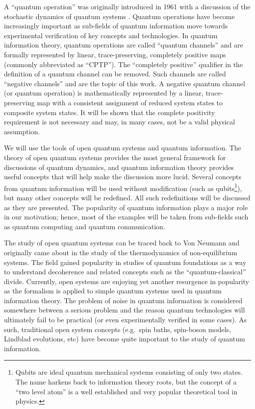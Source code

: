 A ``quantum operation'' was originally introduced in 1961 with a discussion of the stochastic dynamics of quantum systems \cite{Sudarshan1961}.  Quantum operations have become increasingly important as sub-fields of quantum information move towards experimental verification of key concepts and technologies.  In quantum information theory, quantum operations are called ``quantum channels'' and are formally represented by linear, trace-preserving, completely positive maps (commonly abbreviated as ``CPTP'').  The ``completely positive'' qualifier in the definition of a quantum channel can be removed.  Such channels are called ``negative channels'' and are the topic of this work.  A negative quantum channel (or quantum operation) is mathematically represented by a linear, trace-preserving map with a consistent assignment of reduced system states to composite system states.  It will be shown that the complete positivity requirement is not necessary and may, in many cases, not be a valid physical assumption.  

We will use the tools of open quantum systems and quantum information.  The theory of open quantum systems provides the most general framework for discussions of quantum dynamics, and quantum information theory provides useful concepts that will help make the discussion more lucid.  Several concepts from quantum information will be used without modification (such as qubits\footnote{Qubits are ideal quantum mechanical systems consisting of only two states.  The name harkens back to information theory roots, but the concept of a ``two level atom'' is a well established and very popular theoretical tool in physics.}), but many other concepts will be redefined.  All such redefinitions will be discussed as they are presented.  The popularity of quantum information plays a major role in our motivation; hence, most of the examples will be taken from sub-fields such as quantum computing and quantum communication.

The study of open quantum systems can be traced back to Von Neumann \cite{vonNeumann1947} and originally came about in the study of the thermodynamics of non-equilibrium systems.  The field gained popularity in studies of quantum foundations as a way to understand decoherence and related concepts such as the ``quantum-classical'' divide.  Currently, open systems are enjoying yet another resurgence in popularity as the formalism is applied to simple quantum systems used in quantum information theory.  The problem of noise in quantum information is considered somewhere between a serious problem and the reason quantum technologies will ultimately fail to be practical (or even experimentally verified in some cases).  As such, traditional open system concepts (e.g.\ spin baths, spin-boson models, Lindblad evolutions, etc) have become quite important to the study of quantum information.

